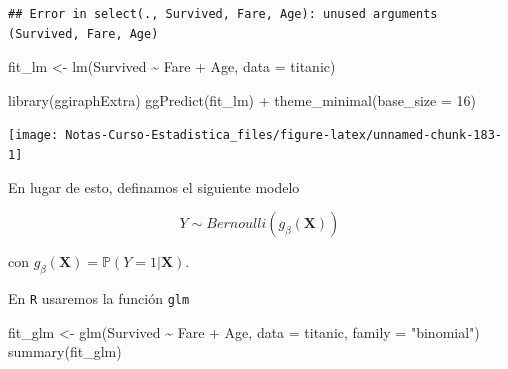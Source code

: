 \documentclass[
  12pt,
]{book}
\newenvironment{Shaded}{\begin{snugshade}}{\end{snugshade}}
\newcommand{\AttributeTok}[1]{\textcolor[rgb]{0.77,0.63,0.00}{#1}}
\newcommand{\DecValTok}[1]{\textcolor[rgb]{0.00,0.00,0.81}{#1}}
\newcommand{\FunctionTok}[1]{\textcolor[rgb]{0.00,0.00,0.00}{#1}}
\newcommand{\NormalTok}[1]{#1}
\newcommand{\OtherTok}[1]{\textcolor[rgb]{0.56,0.35,0.01}{#1}}
\newcommand{\SpecialCharTok}[1]{\textcolor[rgb]{0.00,0.00,0.00}{#1}}
\newcommand{\StringTok}[1]{\textcolor[rgb]{0.31,0.60,0.02}{#1}}
\theoremstyle{definition}
\theoremstyle{definition}
\theoremstyle{definition}
\theoremstyle{definition}
\theoremstyle{remark}
\begin{document}
\begin{verbatim}
## Error in select(., Survived, Fare, Age): unused arguments (Survived, Fare, Age)
\end{verbatim}

\begin{Shaded}
\begin{Highlighting}[]
\NormalTok{fit\_lm }\OtherTok{\textless{}{-}} \FunctionTok{lm}\NormalTok{(Survived }\SpecialCharTok{\textasciitilde{}}\NormalTok{ Fare }\SpecialCharTok{+}\NormalTok{ Age, }\AttributeTok{data =}\NormalTok{ titanic)}
\end{Highlighting}
\end{Shaded}

\begin{Shaded}
\begin{Highlighting}[]
\FunctionTok{library}\NormalTok{(ggiraphExtra)}
\FunctionTok{ggPredict}\NormalTok{(fit\_lm) }\SpecialCharTok{+} \FunctionTok{theme\_minimal}\NormalTok{(}\AttributeTok{base\_size =} \DecValTok{16}\NormalTok{)}
\end{Highlighting}
\end{Shaded}

\begin{center}\texttt{[image: Notas-Curso-Estadistica\_files/figure-latex/unnamed-chunk-183-1]} \end{center}

En lugar de esto, definamos el siguiente modelo

\begin{equation*}
Y \sim Bernoulli (g_{\beta}(\boldsymbol{X})) 
\end{equation*}

con \(g_{\beta}(\boldsymbol{X}) = \mathbb{P}\left(Y=1 \vert \boldsymbol{X}\right)\).

En \texttt{R} usaremos la función \texttt{glm}

\begin{Shaded}
\begin{Highlighting}[]
\NormalTok{fit\_glm }\OtherTok{\textless{}{-}} \FunctionTok{glm}\NormalTok{(Survived }\SpecialCharTok{\textasciitilde{}}\NormalTok{ Fare }\SpecialCharTok{+}\NormalTok{ Age, }\AttributeTok{data =}\NormalTok{ titanic,}
    \AttributeTok{family =} \StringTok{"binomial"}\NormalTok{)}
\FunctionTok{summary}\NormalTok{(fit\_glm)}
\end{Highlighting}
\end{Shaded}
\end{document}
